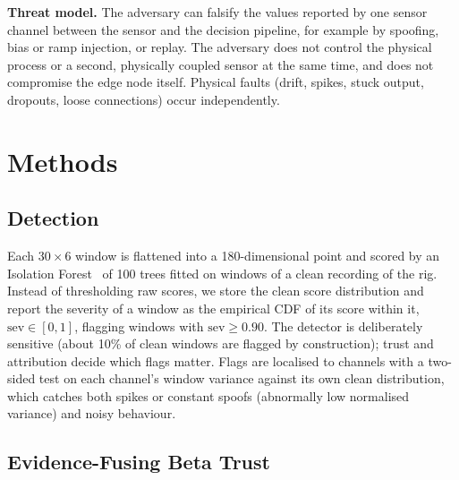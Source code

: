 \documentclass[conference]{IEEEtran}
\begin{document}
\textbf{Threat model.} The adversary can falsify the values reported by one sensor channel between the sensor and the decision pipeline, for example by spoofing, bias or ramp injection, or replay. The adversary does not control the physical process or a second, physically coupled sensor at the same time, and does not compromise the edge node itself. Physical faults (drift, spikes, stuck output, dropouts, loose connections) occur independently.

\section{Methods}

\subsection{Detection}

Each $30 \times 6$ window is flattened into a 180-dimensional point and scored by an Isolation Forest~\cite{liu2008iforest} of 100 trees fitted on windows of a clean recording of the rig. Instead of thresholding raw scores, we store the clean score distribution and report the severity of a window as the empirical CDF of its score within it, $\mathrm{sev} \in [0, 1]$, flagging windows with $\mathrm{sev} \geq 0.90$. The detector is deliberately sensitive (about 10\% of clean windows are flagged by construction); trust and attribution decide which flags matter. Flags are localised to channels with a two-sided test on each channel's window variance against its own clean distribution, which catches both spikes or constant spoofs (abnormally low normalised variance) and noisy behaviour.

\subsection{Evidence-Fusing Beta Trust}
\end{document}

